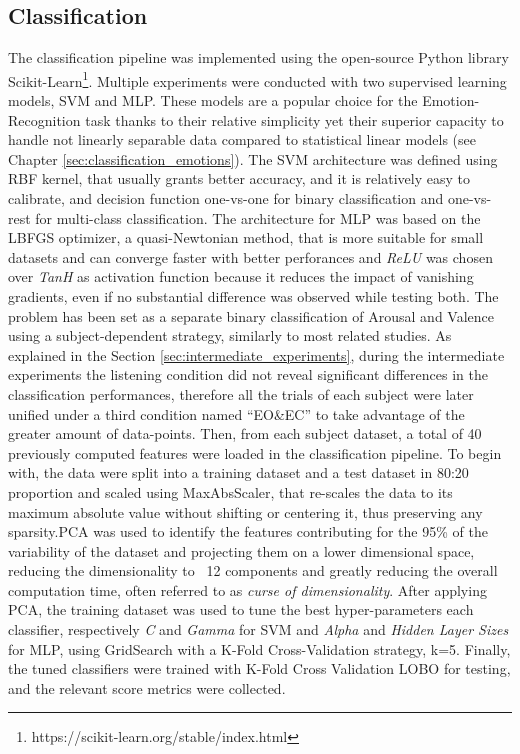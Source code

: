 \subsection{Classification}
\label{sec:classification}
The classification pipeline was implemented using the open-source Python library Scikit-Learn\footnote{https://scikit-learn.org/stable/index.html}. Multiple experiments were conducted with two supervised learning models, \ac{SVM} and \ac{MLP}. These models are a popular choice for the Emotion-Recognition task thanks to their relative simplicity yet their superior capacity to handle not linearly separable data compared to statistical linear models (see Chapter \ref{sec:classification_emotions}). The \ac{SVM} architecture was defined using RBF kernel, that usually grants better accuracy, and it is relatively easy to calibrate, and decision function one-vs-one for binary classification and one-vs-rest for multi-class classification. The architecture for \ac{MLP} was based on the LBFGS optimizer, a quasi-Newtonian method, that is more suitable for small datasets and can converge faster with better perforances and \emph{ReLU} was chosen over \emph{TanH} as activation function because it reduces the impact of vanishing gradients, even if no substantial difference was observed while testing both. The problem has been set as a separate binary classification of Arousal and Valence using a subject-dependent strategy, similarly to most related studies. As explained in the Section \ref{sec:intermediate_experiments}, during the intermediate experiments the listening condition did not reveal significant differences in the classification performances, therefore all the trials of each subject were later unified under a third condition named “EO\&EC” to take advantage of the greater amount of data-points. Then, from each subject dataset, a total of 40 previously computed features were loaded in the classification pipeline. To begin with, the data were split into a training dataset and a test dataset in 80:20 proportion and scaled using MaxAbsScaler, that re-scales the data to its maximum absolute value without shifting or centering it, thus preserving any sparsity.\ac{PCA} was used to identify the features contributing for the 95\% of the variability of the dataset and projecting them on a lower dimensional space, reducing the dimensionality to ~12 components and greatly reducing the overall computation time, often referred to as \emph{curse of dimensionality}. After applying \ac{PCA}, the training dataset was used to tune the best hyper-parameters each classifier, respectively \emph{C} and \emph{Gamma} for \ac{SVM} and \emph{Alpha} and \emph{Hidden Layer Sizes} for \ac{MLP}, using GridSearch with a K-Fold Cross-Validation strategy, k=5. Finally, the tuned classifiers were trained with K-Fold Cross Validation \ac{LOBO} for testing, and the relevant score metrics were collected.

